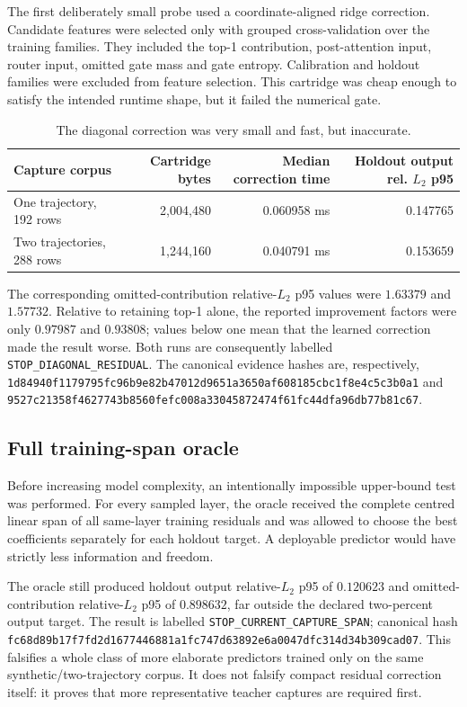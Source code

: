 The first deliberately small probe used a coordinate-aligned ridge correction.
Candidate features were selected only with grouped cross-validation over the
training families.  They included the top-1 contribution, post-attention input,
router input, omitted gate mass and gate entropy.  Calibration and holdout
families were excluded from feature selection.  This cartridge was cheap enough
to satisfy the intended runtime shape, but it failed the numerical gate.

\begin{table}[ht]
\centering
\begin{tabular}{@{}lrrr@{}}
\toprule
Capture corpus & Cartridge bytes & Median correction time & Holdout output rel. $L_2$ p95 \\
\midrule
One trajectory, 192 rows & 2,004,480 & 0.060958 ms & 0.147765 \\
Two trajectories, 288 rows & 1,244,160 & 0.040791 ms & 0.153659 \\
\bottomrule
\end{tabular}
\caption{The diagonal correction was very small and fast, but inaccurate.}
\end{table}

The corresponding omitted-contribution relative-$L_2$ p95 values were
$1.63379$ and $1.57732$.  Relative to retaining top-1 alone, the reported
improvement factors were only $0.97987$ and $0.93808$; values below one mean
that the learned correction made the result worse.  Both runs are consequently
labelled \texttt{STOP\_DIAGONAL\_RESIDUAL}.  The canonical evidence hashes are,
respectively,
\texttt{1d84940f1179795fc96b9e82b47012d9651a3650af608185cbc1f8e4c5c3b0a1}
and
\texttt{9527c21358f4627743b8560fefc008a33045872474f61fc44dfa96db77b81c67}.

\subsection{Full training-span oracle}

Before increasing model complexity, an intentionally impossible upper-bound
test was performed.  For every sampled layer, the oracle received the complete
centred linear span of all same-layer training residuals and was allowed to
choose the best coefficients separately for each holdout target.  A deployable
predictor would have strictly less information and freedom.

The oracle still produced holdout output relative-$L_2$ p95 of $0.120623$ and
omitted-contribution relative-$L_2$ p95 of $0.898632$, far outside the declared
two-percent output target.  The result is labelled
\texttt{STOP\_CURRENT\_CAPTURE\_SPAN}; canonical hash
\texttt{fc68d89b17f7fd2d1677446881a1fc747d63892e6a0047dfc314d34b309cad07}.
This falsifies a whole class of more elaborate predictors trained only on the
same synthetic/two-trajectory corpus.  It does not falsify compact residual
correction itself: it proves that more representative teacher captures are
required first.

